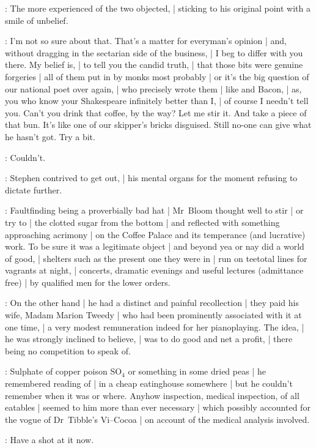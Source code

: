 :
The more experienced of the two objected, |
sticking to his original point with a smile of unbelief.

\Bloom:
I'm not so sure about that.
That's a matter for everyman's opinion |
and, without dragging in the sectarian side of the business, |
I beg to differ with you  there.
My belief is, |
to tell you the candid truth, |
that those bits were genuine forgeries |
all of them put in by monks most probably |
or it's the big question of our national poet over again, |
who precisely wrote them |
like  and Bacon, |
as, you who know your Shakespeare infinitely better than I, |
of course I needn't tell you.
Can't you drink that coffee, by the way? Let me stir it.
And take a piece of that bun.
It's like one of our skipper's bricks disguised.
Still no-one can give what he hasn't got.
Try a bit.

\Stephen:
Couldn't.

:
Stephen contrived to get out, |
his mental organs for the moment refusing to dictate further.

:
Faultfinding being a proverbially bad hat |
Mr~Bloom thought well to stir |
or try to |
the clotted sugar from the bottom |
and reflected with something approaching acrimony |
on the Coffee Palace and its temperance (and lucrative) work.
To be sure it was a legitimate object |
and beyond yea or nay did a world of good, |
shelters such as the present one they were in |
run on teetotal lines for vagrants at night, |
concerts, dramatic evenings and useful lectures (admittance free) |
by qualified men for the lower orders.

:
On the other hand |
he had a distinct and painful recollection |
they paid his wife, Madam Marion Tweedy |
who had been prominently associated with it at one time, |
a very modest remuneration indeed for her pianoplaying.
The idea, |
he was strongly inclined to believe, |
was to do good and net a profit, |
there being no competition to speak of.

:
Sulphate of copper poison SO$_4$ or something in some dried peas |
he remembered reading of |
in a cheap eatinghouse somewhere |
but he couldn't remember when it was or where.
Anyhow inspection, medical inspection, of all eatables |
seemed to him more than ever necessary |
which possibly accounted for the vogue of Dr~Tibble's Vi--Cocoa |
on account of the medical analysis involved.

\Bloom:
Have a shot at it now.

